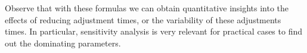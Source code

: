 Observe that with these formulas we can obtain quantitative insights into the effects of reducing adjustment times, or the variability of these adjustments times. In particular, sensitivity analysis is very relevant for practical cases to find out the dominating parameters. 



\begin{comment}

\begin{exercise}
Zijm.Ex.1.11.6
 \begin{solution}
   Cleaning times will be pretty constant. Changing dies, or other
   machine parts, is also typically quite predictable, although it can
   take a lot of time, in particular in case a crane or other heavy
   machinery is needed to replace parts. If the machine require
   temporary adjustments, then the variation in setup times may be
   quite a bit higher.
\end{solution}
\end{exercise}

\begin{exercise}
Zijm.Ex.1.11.7
 \begin{solution}
   Then the effective service times, and in particular, $C_s^2$ will
   be quite a bit bigger. It is preferable to avoid such a situation. 

   Mathematically, it is only given that $N_s$ is a random
   variable. As, however, this does not state anything about its
   distribution, we cannot make any general claim. The intent of the
   problem is to have you check the relevant formulas and notice that
   the variance of $N_s$ appears in the formulas.
\end{solution}
\end{exercise}


  
\end{comment}




